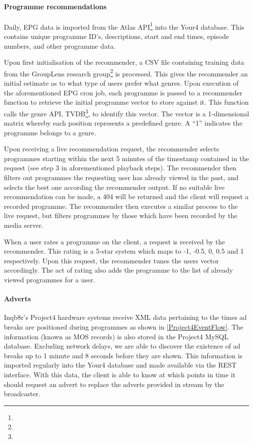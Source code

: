 \paragraph{Programme recommendations}

Daily, EPG data is imported from the Atlas API\footnote{} into the Your4 database. This contains unique programme ID's, descriptions, start and end times, episode numbers, and other programme data.

Upon first initialisation of the recommender, a CSV file containing training data from the GroupLens research group\footnote{} is processed. This gives the recommender an initial estimate as to what type of users prefer what genres. Upon execution of the aforementioned EPG cron job, each programme is passed to a recommender function to retrieve the initial programme vector to store against it. This function calls the genre API, TVDB\footnote{}, to identify this vector. The vector is a 1-dimensional matrix whereby each position represents a predefined genre. A ``1'' indicates the programme belongs to a genre.

Upon receiving a live recommendation request, the recommender selects programmes starting within the next 5 minutes of the timestamp contained in the request (see step 3 in aforementioned playback steps). The recommender then filters out programmes the requesting user has already viewed in the past, and selects the best one according the recommender output. If no suitable live recommendation can be made, a 404 will be returned and the client will request a recorded programme. The recommender then executes a similar process to the live request, but filters programmes by those which have been recorded by the media server.

When a user rates a programme on the client, a request is received by the recommender. This rating is a 5-star system which maps to -1, -0.5, 0, 0.5 and 1 respectively. Upon this request, the recommender tunes the users vector accordingly. The act of rating also adds the programme to the list of already viewed programmes for a user.

\paragraph{Adverts}
\label{sec:lamp-adverts}
Inqb8r's Project4 hardware systems receive XML data pertaining to the times ad breaks are positioned during programmes as shown in \ref{Project4EventFlow}. The information (known as MOS records) is also stored in the Project4 MySQL database. Excluding network delays, we are able to discover the existence of ad breaks up to 1 minute and 8 seconds before they are shown. This information is imported regularly into the Your4 database and made available via the REST interface. With this data, the client is able to know at which points in time it should request an advert to replace the adverts provided in stream by the broadcaster.


